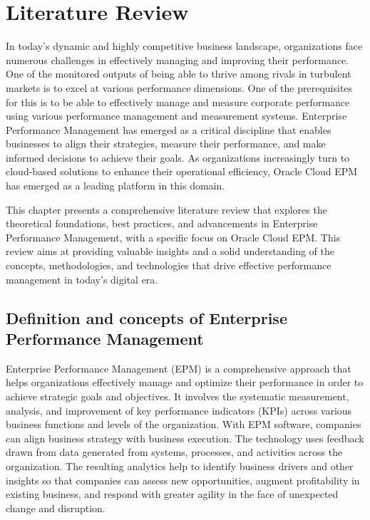\documentclass[12pt,a4paper,openright,twoside]{book}
\begin{document}
\chapter{Literature Review}
\label{chap:background}

In today's dynamic and highly competitive business landscape, organizations face numerous challenges in effectively managing and improving their performance. 
%
One of the monitored outputs of being able to thrive among rivals in turbulent markets is to excel at various performance dimensions. 
%
One of the prerequisites for this is to be able to effectively manage and measure corporate performance using various performance management and measurement systems.
%
Enterprise Performance Management has emerged as a critical discipline that enables businesses to align their strategies, measure their performance, and make informed decisions to achieve their goals. 
%
As organizations increasingly turn to cloud-based solutions to enhance their operational efficiency, Oracle Cloud EPM has emerged as a leading platform in this domain.

This chapter presents a comprehensive literature review that explores the theoretical foundations, best practices, and advancements in Enterprise Performance Management, with a specific focus on Oracle Cloud EPM. 
%
This review aims at providing valuable insights and a solid understanding of the concepts, methodologies, and technologies that drive effective performance management in today's digital era.

\section{Definition and concepts of Enterprise Performance Management}

Enterprise Performance Management (EPM) is a comprehensive approach that helps organizations effectively manage and optimize their performance in order to achieve strategic goals and objectives. 
%
It involves the systematic measurement, analysis, and improvement of key performance indicators (KPIs) across various business functions and levels of the organization.
%
With EPM software, companies can align business strategy with business execution. 
%
The technology uses feedback drawn from data generated from systems, processes, and activities across the organization. 
%
The resulting analytics help to identify business drivers and other insights so that companies can assess new opportunities, augment profitability in existing business, and respond with greater agility in the face of unexpected change and disruption.
\end{document}
